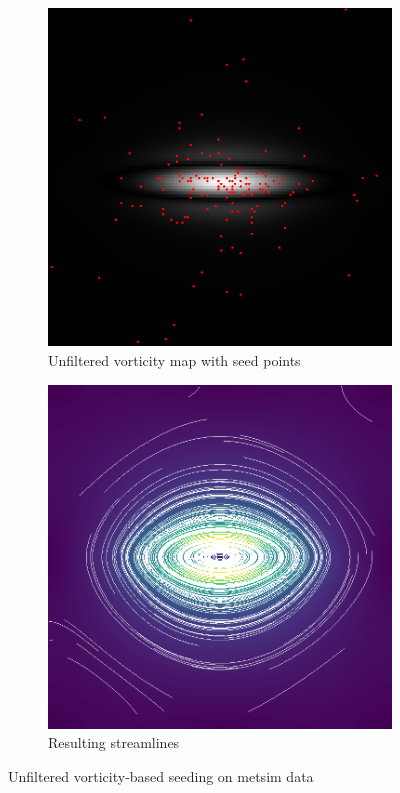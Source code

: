 \documentclass{article}
\begin{document}
\newpage

\begin{figure}[h!]
    \centering
    \begin{subfigure}{0.48\textwidth}
        \centering
        \includegraphics[width=\textwidth]{metsim_vorticity_unfiltered_seeds.eps}
        \caption{Unfiltered vorticity map with seed points}
    \end{subfigure}
    \hfill
    \begin{subfigure}{0.48\textwidth}
        \centering
        \includegraphics[width=\textwidth]{metsim_vorticity_unfiltered.eps}
        \caption{Resulting streamlines\vspace{3mm}}
    \end{subfigure}
    \caption{Unfiltered vorticity-based seeding on metsim data}
\end{figure}
\end{document}
